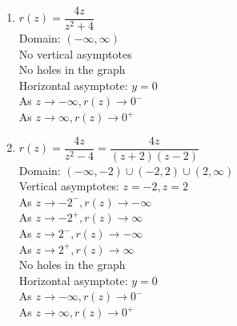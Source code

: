 \begin{multicols}{2}
\begin{enumerate}
\setcounter{enumi}{\value{HW}}

\item $r(z) = \dfrac{4z}{z^{2} + 4}$\\
Domain: $(-\infty,  \infty)$\\
No vertical asymptotes \\
No holes in the graph\\
Horizontal asymptote: $y = 0$ \\
As $z \rightarrow -\infty, r(z) \rightarrow 0^{-}$\\
As $z \rightarrow \infty, r(z) \rightarrow 0^{+}$\\


\vfill

\columnbreak

\item $r(z) = \dfrac{4z}{z^{2} -4} = \dfrac{4z}{(z + 2)(z - 2)}$\\
Domain: $(-\infty, -2) \cup (-2, 2) \cup (2, \infty)$\\
Vertical asymptotes: $z = -2, z = 2$\\
As $z \rightarrow -2^{-}, r(z) \rightarrow -\infty$\\
As $z \rightarrow -2^{+}, r(z) \rightarrow \infty$\\
As $z \rightarrow 2^{-}, r(z) \rightarrow -\infty$\\
As $z \rightarrow 2^{+}, r(z) \rightarrow \infty$\\
No holes in the graph\\
Horizontal asymptote: $y = 0$ \\
As $z \rightarrow -\infty, r(z) \rightarrow 0^{-}$\\
As $z \rightarrow \infty, r(z) \rightarrow 0^{+}$\\

\setcounter{HW}{\value{enumi}}
\end{enumerate}
\end{multicols}


